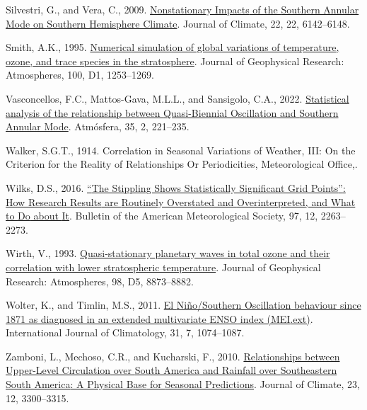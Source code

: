 \documentclass[12pt,oneside]{reedthesis}
\newlength{\cslhangindent}
\newenvironment{CSLReferences}[2] %
 {%
  \setlength{\parindent}{0pt}
  \ifodd #1 \everypar{\setlength{\hangindent}{\cslhangindent}}\ignorespaces\fi
  \ifnum #2 > 0
  \setlength{\parskip}{#2\baselineskip}
  \fi
 }%
 {}
\begin{document}
\begin{CSLReferences}{1}{0}
\leavevmode{}%
Silvestri, G., and Vera, C., 2009. \href{https://doi.org/10.1175/2009JCLI3036.1}{Nonstationary {Impacts} of the {Southern Annular Mode} on {Southern Hemisphere Climate}}. Journal of Climate, 22, 22, 6142--6148.

\leavevmode{}%
Smith, A.K., 1995. \href{https://doi.org/10.1029/94JD02395}{Numerical simulation of global variations of temperature, ozone, and trace species in the stratosphere}. Journal of Geophysical Research: Atmospheres, 100, D1, 1253--1269.

\leavevmode{}%
Vasconcellos, F.C., Mattos-Gava, M.L.L., and Sansigolo, C.A., 2022. \href{https://doi.org/10.20937/ATM.52910}{Statistical analysis of the relationship between {Quasi-Biennial Oscillation} and {Southern Annular Mode}}. Atmósfera, 35, 2, 221--235.

\leavevmode{}%
Walker, S.G.T., 1914. Correlation in {Seasonal Variations} of {Weather}, {III}: {On} the {Criterion} for the {Reality} of {Relationships Or Periodicities}, {Meteorological Office},.

\leavevmode{}%
Wilks, D.S., 2016. \href{https://doi.org/10.1175/BAMS-D-15-00267.1}{{``{The Stippling Shows Statistically Significant Grid Points}''}: {How Research Results} are {Routinely Overstated} and {Overinterpreted}, and {What} to {Do} about {It}}. Bulletin of the American Meteorological Society, 97, 12, 2263--2273.

\leavevmode{}%
Wirth, V., 1993. \href{https://doi.org/10.1029/92JD02820}{Quasi-stationary planetary waves in total ozone and their correlation with lower stratospheric temperature}. Journal of Geophysical Research: Atmospheres, 98, D5, 8873--8882.

\leavevmode{}%
Wolter, K., and Timlin, M.S., 2011. \href{https://doi.org/10.1002/joc.2336}{El {Niño}/{Southern Oscillation} behaviour since 1871 as diagnosed in an extended multivariate {ENSO} index ({MEI}.ext)}. International Journal of Climatology, 31, 7, 1074--1087.

\leavevmode{}%
Zamboni, L., Mechoso, C.R., and Kucharski, F., 2010. \href{https://doi.org/10.1175/2009JCLI3129.1}{Relationships between {Upper-Level Circulation} over {South America} and {Rainfall} over {Southeastern South America}: {A Physical Base} for {Seasonal Predictions}}. Journal of Climate, 23, 12, 3300--3315.

\end{CSLReferences}

\end{document}

